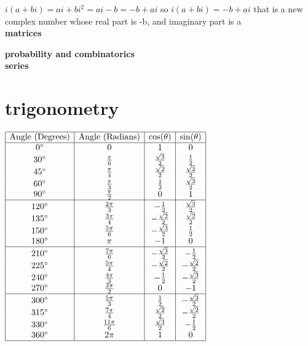 \documentclass{article}
\begin{document}
	$i(a + bi) = ai + bi^2 = ai - b = -b + ai$ so $i(a + bi) = -b + ai$ that is a new complex number whose real part is -b, and imaginary part is a\\

\textbf{matrices}


\textbf{probability and combinatorics}\\


\textbf{series}\\

\section*{trigonometry}

$
\begin{array}{|c|c|c|c|}
\hline
\text{Angle (Degrees)} & \text{Angle (Radians)} & \cos(\theta) & \sin(\theta) \\
\hline
0^\circ & 0 & 1 & 0 \\
30^\circ & \frac{\pi}{6} & \frac{\sqrt{3}}{2} & \frac{1}{2} \\
45^\circ & \frac{\pi}{4} & \frac{\sqrt{2}}{2} & \frac{\sqrt{2}}{2} \\
60^\circ & \frac{\pi}{3} & \frac{1}{2} & \frac{\sqrt{3}}{2} \\
90^\circ & \frac{\pi}{2} & 0 & 1 \\
\hline
120^\circ & \frac{2\pi}{3} & -\frac{1}{2} & \frac{\sqrt{3}}{2} \\
135^\circ & \frac{3\pi}{4} & -\frac{\sqrt{2}}{2} & \frac{\sqrt{2}}{2} \\
150^\circ & \frac{5\pi}{6} & -\frac{\sqrt{3}}{2} & \frac{1}{2} \\
180^\circ & \pi & -1 & 0 \\
\hline
210^\circ & \frac{7\pi}{6} & -\frac{\sqrt{3}}{2} & -\frac{1}{2} \\
225^\circ & \frac{5\pi}{4} & -\frac{\sqrt{2}}{2} & -\frac{\sqrt{2}}{2} \\
240^\circ & \frac{4\pi}{3} & -\frac{1}{2} & -\frac{\sqrt{3}}{2} \\
270^\circ & \frac{3\pi}{2} & 0 & -1 \\
\hline
300^\circ & \frac{5\pi}{3} & \frac{1}{2} & -\frac{\sqrt{3}}{2} \\
315^\circ & \frac{7\pi}{4} & \frac{\sqrt{2}}{2} & -\frac{\sqrt{2}}{2} \\
330^\circ & \frac{11\pi}{6} & \frac{\sqrt{3}}{2} & -\frac{1}{2} \\
360^\circ & 2\pi & 1 & 0 \\
\hline
\end{array}
$\\
\end{document}
